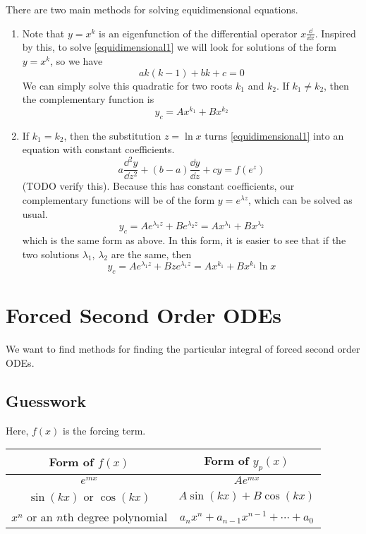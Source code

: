 \documentclass{article}
\begin{document}
There are two main methods for solving equidimensional equations.
\begin{enumerate}
    \item Note that $y = x^k$ is an eigenfunction of the differential operator $x\frac{\dd}{\dd{x}}$. Inspired by this, to solve \eqref{equidimensional1} we will look for solutions of the form $y=x^k$, so we have
          \[ ak(k-1) + bk + c = 0 \]
          We can simply solve this quadratic for two roots $k_1$ and $k_2$. If $k_1 \neq k_2$, then the complementary function is
          \[ y_c = Ax^{k_1} + Bx^{k_2} \]
    \item If $k_1 = k_2$, then the substitution $z = \ln x$ turns \eqref{equidimensional1} into an equation with constant coefficients.
          \[ a \frac{\dd^2 y}{\dd{z}^2} + (b-a)\frac{\dd{y}}{\dd{z}} + cy = f(e^z) \]
          (TODO verify this). Because this has constant coefficients, our complementary functions will be of the form $y = e^{\lambda z}$, which can be solved as usual.
          \[ y_c = Ae^{\lambda_1 z} + Be^{\lambda_2 z} = Ax^{\lambda_1} + Bx^{\lambda_2} \]
          which is the same form as above. In this form, it is easier to see that if the two solutions $\lambda_1$, $\lambda_2$ are the same, then
          \[ y_c = Ae^{\lambda_1 z} + Bze^{\lambda_1 z} = Ax^{k_1} + Bx^{k_1}\ln x \]
\end{enumerate}

\section{Forced Second Order ODEs}
We want to find methods for finding the particular integral of forced second order ODEs.
\subsection{Guesswork}
Here, $f(x)$ is the forcing term.

\begin{tabular}{c c}
    Form of $f(x)$                      & Form of $y_p(x)$                         \\\hline
    $e^{mx}$                            & $Ae^{mx}$                                \\
    $\sin(kx)$ or $\cos(kx)$            & $A\sin(kx) + B\cos(kx)$                  \\
    $x^n$ or an $n$th degree polynomial & $a_nx^n + a_{n-1}x^{n-1} + \cdots + a_0$
\end{tabular}
\end{document}
